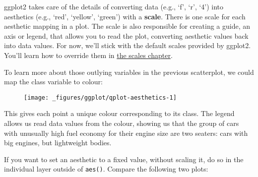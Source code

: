 ggplot2 takes care of the details of converting data (e.g., `f', `r',
`4') into aesthetics (e.g., `red', `yellow', `green') with a
\textbf{scale}. There is one scale for each aesthetic mapping in a plot.
The scale is also responsible for creating a guide, an axis or legend,
that allows you to read the plot, converting aesthetic values back into
data values. For now, we'll stick with the default scales provided by
ggplot2. You'll learn how to override them in \hyperref[cha:scales]{the
scales chapter}.

To learn more about those outlying variables in the previous
scatterplot, we could map the class variable to colour:

\begin{Shaded}
\begin{Highlighting}[]
 \StringTok{ }
\StringTok{  }\NormalTok{()}
\end{Highlighting}
\end{Shaded}

\begin{figure}[H]
  \centering
  \texttt{[image: \_figures/ggplot/qplot-aesthetics-1]}
\end{figure}

This gives each point a unique colour corresponding to its class. The
legend allows us read data values from the colour, showing us that the
group of cars with unusually high fuel economy for their engine size are
two seaters: cars with big engines, but lightweight bodies.

If you want to set an aesthetic to a fixed value, without scaling it, do
so in the individual layer outside of \texttt{aes()}. Compare the
following two plots: 

\begin{Shaded}
\begin{Highlighting}[]
\StringTok{ }\NormalTok{(}\NormalTok{(} \NormalTok{))}
\StringTok{ }\NormalTok{(} \NormalTok{)}
\end{Highlighting}
\end{Shaded}

